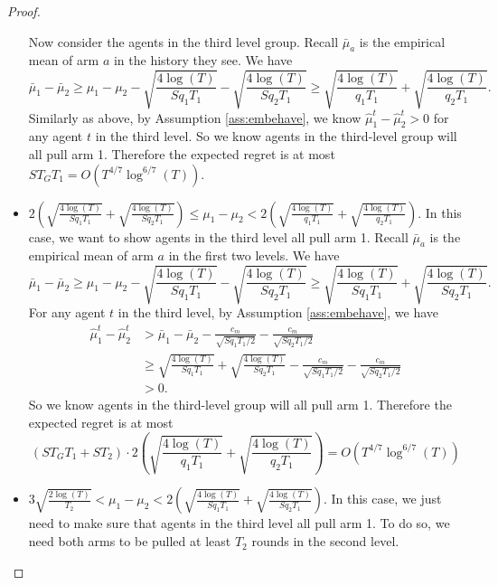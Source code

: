 \begin{proof}
\begin{itemize}
Now consider the agents in the third level group. Recall $\bar{\mu}_a$ is the empirical mean of arm $a$ in the history they see. We have
\[
\bar{\mu}_1 - \bar{\mu}_2 \geq \mu_1 -\mu_2 - \sqrt{\frac{4\log(T)}{Sq_1T_1}} - \sqrt{\frac{4\log(T)}{Sq_2T_1}} \geq  \sqrt{\frac{4\log(T)}{q_1T_1}} 
+ \sqrt{\frac{4\log(T)}{q_2T_1}}.
\]
Similarly as above, by Assumption \ref{ass:embehave}, we know $\hat{\mu}_1^t - \hat{\mu}_2^t > 0$ for any agent $t$ in the third level. So we know agents in the third-level group will all pull arm 1. Therefore the expected regret is at most $S T_G T_1 = O(T^{4/7} \log^{6/7}(T))$. 


\item $2\left(\sqrt{\frac{4\log(T)}{Sq_1T_1}} 
+ \sqrt{\frac{4\log(T)}{Sq_2T_1}}\right) \leq \mu_1-\mu_2 < 2\left(\sqrt{\frac{4\log(T)}{q_1T_1}} 
+ \sqrt{\frac{4\log(T)}{q_2T_1}}\right)$. In this case, we want to show agents in the third level all pull arm 1. Recall $\bar{\mu}_a$ is the empirical mean of arm $a$ in the first two levels. We have
\[
\bar{\mu}_1 - \bar{\mu}_2 \geq \mu_1 -\mu_2 - \sqrt{\frac{4\log(T)}{Sq_1T_1}} - \sqrt{\frac{4\log(T)}{Sq_2T_1}} \geq  \sqrt{\frac{4\log(T)}{Sq_1T_1}} 
+ \sqrt{\frac{4\log(T)}{Sq_2T_1}}.
\]
For any agent $t$ in the third level, by Assumption \ref{ass:embehave}, we have
\begin{align*}
\hat{\mu}_1^t - \hat{\mu}_2^t &>\bar{\mu}_1 - \bar{\mu}_2 - \frac{c_m}{\sqrt{Sq_1T_1/2}} - \frac{c_m}{\sqrt{Sq_2T_1/2}}\\
&\geq  \sqrt{\frac{4\log(T)}{Sq_1T_1}} + \sqrt{\frac{4\log(T)}{Sq_2T_1}}- \frac{c_m}{\sqrt{Sq_1T_1/2}} - \frac{c_m}{\sqrt{Sq_2T_1/2}}\\
 &> 0.
\end{align*}
So we know agents in the third-level group will all pull arm 1. Therefore the expected regret is at most 
\[
(S T_G T_1 + S T_2) \cdot 2\left(\sqrt{\frac{4\log(T)}{q_1T_1}} 
+ \sqrt{\frac{4\log(T)}{q_2T_1}}\right) = O(T^{4/7} \log^{6/7}(T))
\]

\item $ 3\sqrt{\frac{2\log(T)}{T_2}} < \mu_1-\mu_2 < 2\left(\sqrt{\frac{4\log(T)}{Sq_1T_1}} 
+ \sqrt{\frac{4\log(T)}{Sq_2T_1}}\right)$. In this case, we just need to make sure that agents in the third level all pull arm 1. To do so, we need both arms to be pulled at least $T_2$ rounds in the second level.  


\end{itemize}
\end{proof}
